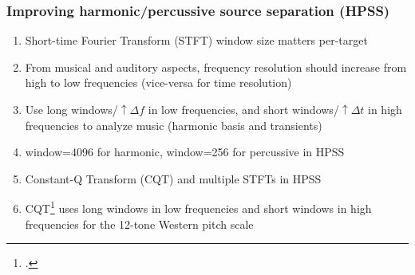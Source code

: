 \documentclass[usenames,dvipsnames]{beamer}
\begin{document}
\begin{frame}
	\frametitle{Improving harmonic/percussive source separation (HPSS)}
	\begin{enumerate}
	\item
		Short-time Fourier Transform (STFT) window size matters per-target
	\item
		From musical and auditory aspects, frequency resolution should increase from high to low frequencies (vice-versa for time resolution)
	\item
		Use long windows/$\uparrow \Delta f$ in low frequencies, and short windows/$\uparrow \Delta t$ in high frequencies to analyze music (harmonic basis and transients)
	\item
		window=4096 for harmonic, window=256 for percussive in HPSS
	\item
		Constant-Q Transform (CQT) and multiple STFTs in HPSS
	\item
		CQT\footcite{jbrown, klapuricqt} uses long windows in low frequencies and short windows in high frequencies for the 12-tone Western pitch scale
	\end{enumerate}
\end{frame}
\end{document}
